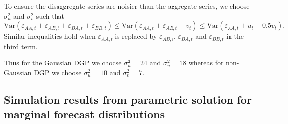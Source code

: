 \documentclass[12pt]{article}
\def\var{\text{Var}}
\theoremstyle{definition}
\begin{document}
To ensure the disaggregate series are noisier than the aggregate series, we choose $\sigma^2_u$ and $\sigma^2_v$ such that
\[
\var(\varepsilon_{AA,t} + \varepsilon_{AB,t} + \varepsilon_{BA,t} + \varepsilon_{BB,t})
\le \var(\varepsilon_{AA,t}+\varepsilon_{AB,t}-v_t)
\le \var(\varepsilon_{AA,t}+u_t-0.5v_t).
\]
Similar inequalities hold when $\varepsilon_{AA,t}$ is replaced by $\varepsilon_{AB,t}$, $\varepsilon_{BA,t}$ and $\varepsilon_{BB,t}$ in the third term.

Thus for the Gaussian DGP we choose $\sigma^2_u = 24$ and $\sigma^2_u = 18$ whereas for non-Gaussian DGP we choose $\sigma^2_u = 10$ and $\sigma^2_v = 7$.

\subsection{Simulation results from parametric solution for marginal forecast distributions}\label{Append:Gauss_sim_Univ}
\end{document}
